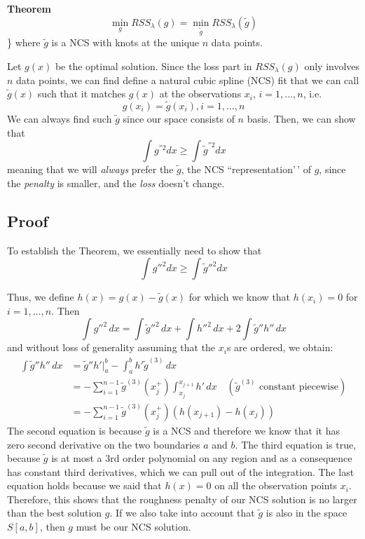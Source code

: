 \documentclass[
]{book}
\begin{document}
\textbf{Theorem}
\[\min_g RSS_{\lambda}(g) = \min_{\tilde{g}} RSS_{\lambda}(\tilde{g}) \]\}
where \(\tilde{g}\) is a NCS with knots at the unique \(n\) data points.

Let \(g(x)\) be the optimal solution. Since the loss part in \(RSS_\lambda(g)\) only involves \(n\) data points, we can find define a natural cubic spline (NCS) fit that we can call \(\tilde{g}(x)\) such that it matches \(g(x)\) at the observations \(x_i\), \(i=1, \ldots, n\), i.e.
\[g(x_i) = \tilde{g}(x_i), i=1, \ldots, n\]
We can always find such \(\tilde{g}\) since our space consists of \(n\) basis. Then, we can show that
\[\int g^{''2} dx \geq \int  \tilde{g}^{''2} dx\]
meaning that we will \emph{always} prefer the \(\tilde{g}\), the NCS ``representation'\,' of
\(g\), since the \emph{penalty} is smaller, and the \emph{loss} doesn't change.

\subsection{Proof}\label{proof}

To establish the Theorem, we essentially need to show that
\[\int g''^{2} dx \geq \int  \tilde{g}''^{2} dx\]

Thus, we define \(h(x) = g(x) - \tilde{g}(x)\) for which we know that \(h(x_i)=0\) for \(i=1, \ldots, n\). Then
\[ \int g''^2 \, dx  = \int \tilde{g}''^2 \, dx  + \int h''^2 \, dx  + 2 \int \tilde{g}'' h'' \, dx
\]
and without loss of generality assuming that the \(x_i\)s are ordered, we obtain:
\begin{align*}
\int \tilde{g}'' h'' \, dx  &= \tilde{g}'' h' \Big|_a^b 
- \int_a^b h' \tilde{g}^{(3)} \, dx\\
&= - \sum_{i=1}^{n-1} \tilde{g}^{(3)}\!\left(x_j^+\right) 
\int_{x_j}^{x_{j+1}} h' \, dx 
\quad (\tilde{g}^{(3)} \text{ constant piecewise})\\
&= - \sum_{i=1}^{n-1} \tilde{g}^{(3)}\!\left(x_j^+\right) 
\left(h(x_{j+1}) - h(x_j)\right)
\end{align*}
The second equation is because \(\tilde{g}\) is a NCS and therefore we know that it has zero second derivative on the two boundaries \(a\) and \(b\). The third equation is true, because \(\tilde{g}\) is at most a 3rd order polynomial on any region and as a consequence has constant third derivatives, which we can pull out of the integration. The last equation holds because we said that \(h(x)=0\) on all the observation points \(x_i\). Therefore, this shows that the roughness penalty of our NCS solution is no larger than the best solution \(g\). If we also take into account that \(\tilde{g}\) is also in the space \(S[a,b]\), then \(g\) must be our NCS solution.
\end{document}
